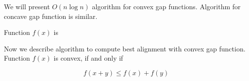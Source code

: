We will present $O(n\log n)$ algorithm for convex gap functions. Algorithm for
concave gap function is similar. 

\begin{definition}
Function $f(x)$ is 
\end{definition}

Now we describe algorithm to compute best alignment with convex gap function.
Function $f(x)$ is convex, if and only if

\[f(x+y)\leq f(x)+f(y)\]
 




